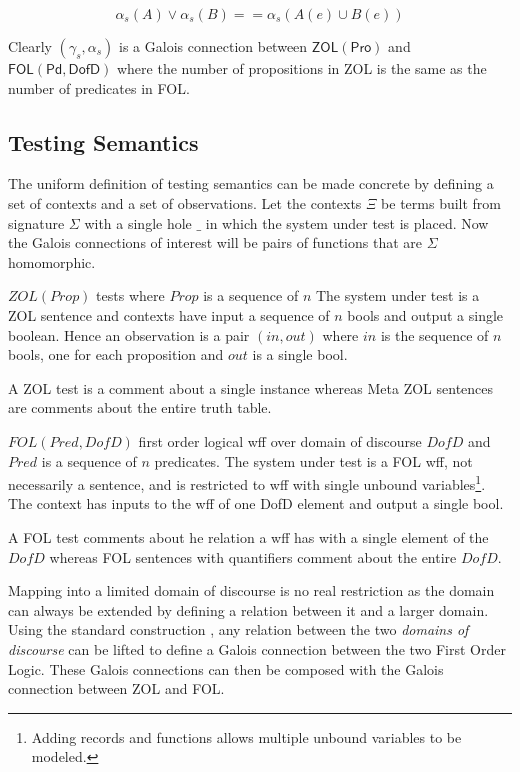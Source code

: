 \[\alpha_s(A) \vee \alpha_s(B) == \alpha_s(A(e) \cup  B(e))\]




Clearly $(\gamma_s,\alpha_s)$ is a Galois connection between $\mathsf{ZOL(Pro)}$ and  $\mathsf{FOL(Pd,DofD)}$ where the number of propositions in ZOL is the same as the number of predicates in FOL. 
 


\subsection{Testing Semantics}
The uniform definition of testing semantics can be made concrete by defining a set of contexts and a set of observations. Let the contexts $\Xi$ be terms built from signature $\Sigma$ with a single hole $\_$ in which the system under test is placed. Now the Galois connections of interest will be pairs of functions that are  $\Sigma$ homomorphic.

$ZOL(Prop)$ tests where $Prop$ is a sequence of $n$ The system under test is a ZOL sentence and  contexts have input a sequence of $n$ bools and output  a single boolean.   Hence an observation is a pair $(in,out)$ where $in$ is the sequence of $n$ bools, one for each proposition and $out$ is a single bool.

A ZOL test is a comment about a single instance whereas Meta ZOL sentences are comments about the entire truth table.

$FOL(Pred,DofD)$ first order logical wff over domain of discourse $DofD$ and $Pred$ is a sequence of $n$ predicates. The system under test is a FOL wff, not necessarily a sentence, and is restricted to wff with single unbound variables\footnote{Adding records and functions allows multiple unbound variables to be modeled.}.  The context has inputs to the wff of one DofD element and output a single bool.

A FOL test comments about he relation a wff has with a single element of the $DofD$ whereas FOL sentences with quantifiers comment about the entire $DofD$.
 

Mapping into a limited domain of discourse is no real restriction as the domain can always be extended  by defining a relation between it and a larger domain.  Using  the standard construction  \cite{GaloisPeter}, any relation between the two \emph{domains of discourse} can be lifted to define a Galois connection between the two First Order Logic. These Galois connections can then be composed with the Galois connection between ZOL and FOL.

